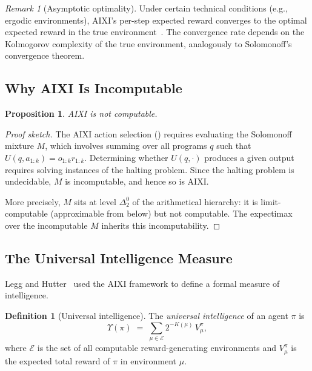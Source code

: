 \documentclass[11pt,a4paper]{article}
\newtheorem{proposition}[theorem]{Proposition}
\theoremstyle{definition}
\newtheorem{definition}[theorem]{Definition}
\theoremstyle{remark}
\newtheorem{remark}[theorem]{Remark}
\begin{document}
\begin{remark}[Asymptotic optimality]
Under certain technical conditions (e.g., ergodic environments), AIXI's
per-step expected reward converges to the optimal expected reward in the
true environment~\cite{Hutter2005}.  The convergence rate depends on the
Kolmogorov complexity of the true environment, analogously to Solomonoff's
convergence theorem.
\end{remark}

\subsection{Why AIXI Is Incomputable}

\begin{proposition}\label{prop:incomputable}
AIXI is not computable.
\end{proposition}

\begin{proof}[Proof sketch]
The AIXI action selection () requires evaluating the
Solomonoff mixture $M$, which involves summing over all programs $q$ such
that $U(q,a_{1:k})=o_{1:k}r_{1:k}$.  Determining whether $U(q,\cdot)$
produces a given output requires solving instances of the halting problem.
Since the halting problem is undecidable, $M$ is incomputable, and hence
so is AIXI.

More precisely, $M$ sits at level $\Delta^0_2$ of the arithmetical hierarchy:
it is limit-computable (approximable from below) but not computable.
The expectimax over the incomputable $M$ inherits this incomputability.
\end{proof}

\subsection{The Universal Intelligence Measure}

Legg and Hutter~\cite{Legg2007} used the AIXI framework to define a formal
measure of intelligence.

\begin{definition}[Universal intelligence]\label{def:intelligence}
The \emph{universal intelligence} of an agent $\pi$ is
\[
  \Upsilon(\pi) \;=\; \sum_{\mu\in\mathcal{E}} 2^{-K(\mu)}\,V_\mu^\pi,
\]
where $\mathcal{E}$ is the set of all computable reward-generating environments
and $V_\mu^\pi$ is the expected total reward of $\pi$ in environment $\mu$.
\end{definition}
\end{document}

